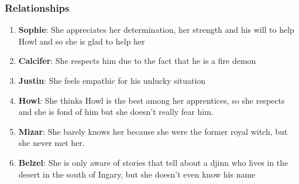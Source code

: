 




\subsubsection*{Relationships}
\begin{enumerate}
\item \textbf{Sophie}: She appreciates her determination, her strength and his will to help Howl and so she is glad to help her
\item \textbf{Calcifer}: She respects him due to the fact that he is a fire demon
\item \textbf{Justin}: She feels empathic for his unlucky situation
\item \textbf{Howl}: She thinks Howl is the best among her apprentices, so she respects and she is fond of him but she doesn't really  fear him.
\item \textbf{Mizar}: She barely knows her because she were the former royal witch, but she never met her.
\item \textbf{Belzel}: She is only aware of stories that tell about a djinn who lives in the desert in the south of Ingary, but she doesn't even know his name
\end{enumerate}

